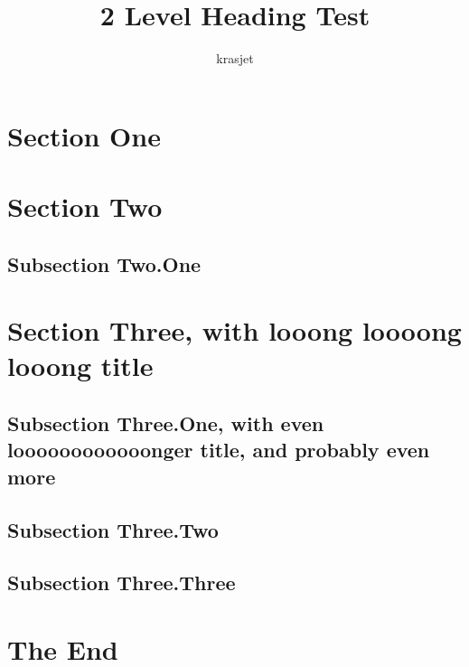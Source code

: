 \documentclass{article}
\title{2 Level Heading Test}
\author{krasjet}
\date{}
\begin{document}
\maketitle

\section{Section One}

\lipsum[2-4]

\section{Section Two}

\lipsum[2-5]

\subsection{Subsection Two.One}
\lipsum[2-5]

\section{Section Three, with looong loooong looong title}

\lipsum[1-2]

\subsection{Subsection Three.One, with even loooooooooooonger title, and
probably even more}
\lipsum[2-5]

\subsection{Subsection Three.Two}
\lipsum[1-1]

\subsection{Subsection Three.Three}
\lipsum[2-3]

\section{The End}

\lipsum[2-5]
\end{document}
